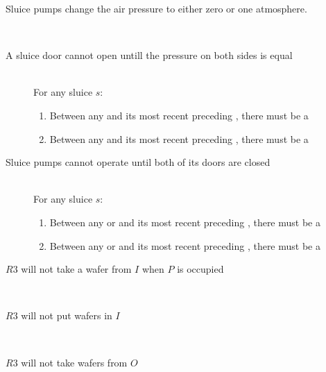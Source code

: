 \begin{description}
 
 \item[Sluice pumps change the air pressure to either zero or one atmosphere.] \hfill \\
 
 \item[A sluice door cannot open untill the pressure on both sides is equal] \hfill \\
 For any sluice $s$:
 \begin{enumerate}
  \item Between any  and its most recent preceding , there must be a 
  \item Between any  and its most recent preceding , there must be a 
 \end{enumerate}

 \item[Sluice pumps cannot operate until both of its doors are closed] \hfill \\
 For any sluice $s$:
 \begin{enumerate}
  \item Between any  or  and its most recent preceding , there must be a 
  \item Between any  or  and its most recent preceding , there must be a 
 \end{enumerate}

 \item[$R3$ will not take a wafer from $I$ when $P$ is occupied] \hfill \\
 
 \item[$R3$ will not put wafers in $I$] \hfill \\
 
 \item[$R3$ will not take wafers from $O$] \hfill \\
 
\end{description}
